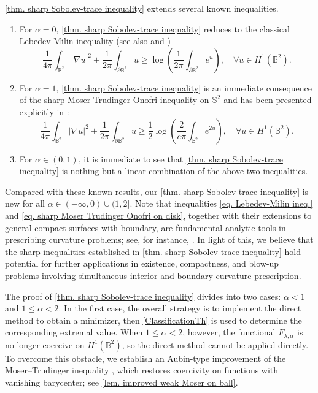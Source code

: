 \documentclass[11pt,a4paper,twoside]{amsart}
\newtheorem{sketch proof}{Sketch of the proof}[section]
\begin{document}
    \cref{thm. sharp Sobolev-trace inequality} extends several known inequalities. 
\begin{enumerate}
    \item For $\alpha=0$, \cref{thm. sharp Sobolev-trace inequality} reduces to the classical Lebedev-Milin inequality \cite{LM51} (see also \cite[Chapter 5.1]{Dur01} and \cite[(4')]{Osgood88}) 
    \begin{equation}
    \label{eq. Lebedev-Milin ineq.}
        \frac{1}{4\pi}\int_{\mathbb{B}^2}|\nabla u|^{2}
    +\frac{1}{2\pi}\int_{\partial\mathbb{B}^2}u
    \geq \log\left(\frac{1}{2\pi}\int_{\partial\mathbb{B}^2}e^{u}\right),\quad 
    \forall u\in H^1(\mathbb{B}^2).
    \end{equation}
    
\item For $\alpha=1$, \cref{thm. sharp Sobolev-trace inequality} is an immediate consequence of the sharp Moser-Trudinger-Onofri inequality on $\mathbb{S}^2$ and has been presented explicitly in  \cite[Eq. (1.8)]{Dou-Xu}:
\begin{equation}
\label{eq. sharp Moser Trudinger Onofri on disk}
    \frac{1}{4\pi}\int_{\mathbb{B}^2}|\nabla u|^2
        +\frac{1}{2\pi}
        \int_{\partial \mathbb{B}^2}u
        \geq\frac{1}{2}
        \log\left(
        \frac{2}{e\pi}\int_{\mathbb{B}^2}e^{2u}
        \right),\quad 
         \forall u\in H^1(\mathbb{B}^2).
\end{equation}

\item For $\alpha\in(0,1)$, it is immediate to see that \cref{thm. sharp Sobolev-trace inequality} is nothing but a linear combination of the above two inequalities.
\end{enumerate}
    
    Compared with these known results, our \cref{thm. sharp Sobolev-trace inequality} is new for all $\alpha\in(-\infty,0)\cup(1,2]$. 
    Note that inequalities \cref{eq. Lebedev-Milin ineq.} and  \cref{eq. sharp Moser Trudinger Onofri on disk}, together with their extensions to general compact surfaces with boundary, are fundamental analytic tools in prescribing curvature problems; see, for instance, \cite{CBR18}. In light of this, we believe that the sharp inequalities established in \cref{thm. sharp Sobolev-trace inequality} hold potential for further applications in existence, compactness, and blow-up problems involving simultaneous interior and boundary curvature prescription.

    The proof of \cref{thm. sharp Sobolev-trace inequality} divides into two cases: $\alpha<1$ and $1\leq\alpha<2$. In the first case, the overall strategy is to implement the direct method to obtain a minimizer, then \cref{ClassificationTh} is used to determine the corresponding extremal value. When $1\leq\alpha<2$, however, the functional $F_{\lambda,\alpha}$ is no longer coercive on $H^1(\mathbb{B}^2)$, so the direct method cannot be applied directly. To overcome this obstacle, we establish an Aubin-type improvement of the Moser--Trudinger inequality \cite{Aub79}, which restores coercivity on  functions with vanishing barycenter; see \cref{lem. improved weak Moser on ball}.
\end{document}
